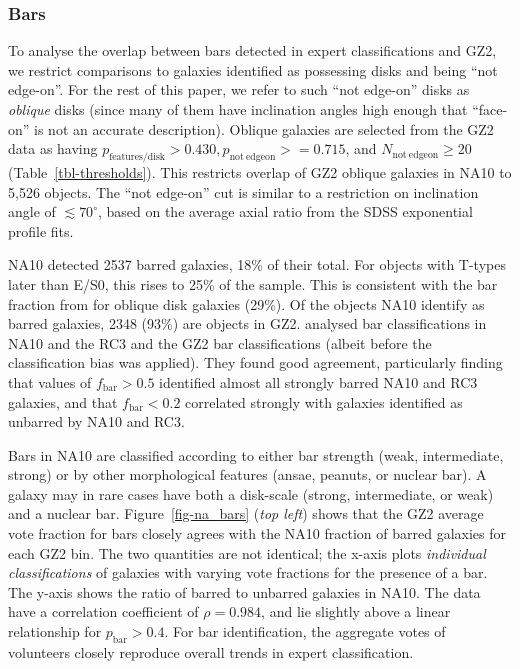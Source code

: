 \documentclass[useAMS,usenatbib]{mn2e}
\begin{document}


\subsubsection{Bars}\label{sssec-bars}

To analyse the overlap between bars detected in expert classifications and GZ2, we restrict comparisons to galaxies identified as possessing disks and being ``not edge-on''. For the rest of this paper, we refer to such ``not edge-on'' disks as {\em oblique} disks (since many of them have inclination angles high enough that ``face-on'' is not an accurate description). Oblique galaxies are selected from the GZ2 data as having $p_\mathrm{features/disk}>0.430, p_\mathrm{not~edgeon}>=0.715$, and $N_\mathrm{not~edgeon}\geq20$ (Table~\ref{tbl-thresholds}). This restricts overlap of GZ2 oblique galaxies in NA10 to 5,526 objects. The ``not edge-on'' cut is similar to a restriction on inclination angle of $\lesssim70^\circ$, based on the average axial ratio from the SDSS exponential profile fits.

NA10 detected 2537 barred galaxies, 18\% of their total. For objects with T-types later than E/S0, this rises to 25\% of the sample. This is consistent with the bar fraction from \citet{mas11c} for oblique disk galaxies (29\%). Of the objects NA10 identify as barred galaxies, 2348 (93\%) are objects in GZ2. \citet{mas11c} analysed bar classifications in NA10 and the RC3 and the GZ2 bar classifications (albeit before the classification bias was applied). They found good agreement, particularly finding that values of $f_\mathrm{bar}>0.5$ identified almost all strongly barred NA10 and RC3 galaxies, and that $f_\mathrm{bar}<0.2$ correlated strongly with galaxies identified as unbarred by NA10 and RC3. 

Bars in NA10 are classified according to either bar strength (weak, intermediate, strong) or by other morphological features (ansae, peanuts, or nuclear bar). A galaxy may in rare cases have both a disk-scale (strong, intermediate, or weak) and a nuclear bar. Figure~\ref{fig-na_bars} ({\it top left}) shows that the GZ2 average vote fraction for bars closely agrees with the NA10 fraction of barred galaxies for each GZ2 bin. The two quantities are not identical; the x-axis plots {\it individual classifications} of galaxies with varying vote fractions for the presence of a bar. The y-axis shows the ratio of barred to unbarred galaxies in NA10. The data have a correlation coefficient of $\rho=0.984$, and lie slightly above a linear relationship for $p_\mathrm{bar}>0.4$. For bar identification, the aggregate votes of volunteers closely reproduce overall trends in expert classification. 
\end{document}
